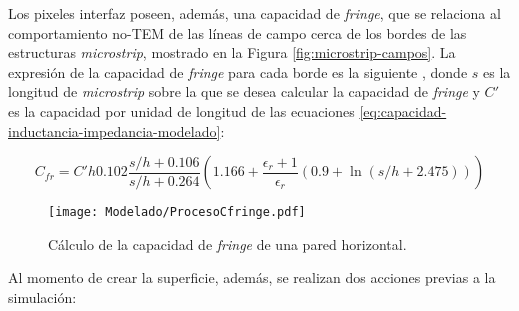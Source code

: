 Los pixeles interfaz poseen, además, una capacidad de \textit{fringe}, que se relaciona al comportamiento no-TEM de las líneas de campo cerca de los bordes de las estructuras \textit{microstrip}, mostrado en la Figura \ref{fig:microstrip-campos}. La expresión de la capacidad de \textit{fringe} para cada borde es la siguiente \cite{Hammerstad:discont}, donde $s$ es la longitud de \textit{microstrip} sobre la que se desea calcular la capacidad de \textit{fringe} y $C'$ es la capacidad por unidad de longitud de las ecuaciones \ref{eq:capacidad-inductancia-impedancia-modelado}:

\begin{equation}
	C_{fr} = C' h 0.102 \frac{s/h+0.106}{s/h+0.264} \left(1.166 + \frac{\epsilon_r+1}{\epsilon_r} (0.9+\ln(s/h+2.475)) \right)
\end{equation}

\begin{figure}[h]
	\centering
	\texttt{[image: Modelado/ProcesoCfringe.pdf]}
	\caption{Cálculo de la capacidad de \textit{fringe} de una pared horizontal.}
	\label{fig:profundidad-para-cfringe}
\end{figure}

Al momento de crear la superficie, además, se realizan dos acciones previas a la simulación:


